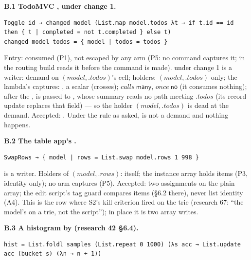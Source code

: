 
\textbf{B.1 TodoMVC , under change 1.}

\begin{Verbatim}
Toggle id → changed model (List.map model.todos λt → if t.id == id then { t | completed = not t.completed } else t)
changed model todos = { model | todos = todos }
\end{Verbatim}

Entry:  consumed (P1),  not escaped by any arm (P5: no command captures it;  in the routing build reads it before the command is made).  under change 1 is a writer: demand on $(\mathit{model},\allowbreak{}.\mathit{todos})$'s cell; holders: $(\mathit{model},\allowbreak{}.\mathit{todos})$ only; the lambda's captures: , a scalar (crosses); $\mathit{calls}\ \mathsf{many}$, $\mathit{once}\ \mathsf{no}$ (it consumes nothing); after the ,  is passed to , whose summary reads no path meeting $.\mathit{todos}$ (its record update replaces that field) — so the holder $(\mathit{model},\allowbreak{}.\mathit{todos})$ is dead at the demand. Accepted: . Under the rule as asked,  is not a demand and nothing happens.

\textbf{B.2 The table app's .}

\begin{Verbatim}
SwapRows → { model | rows = List.swap model.rows 1 998 }
\end{Verbatim}

 is a writer. Holders of $(\mathit{model},\allowbreak{}.\mathit{rows})$: itself; the instance array holds items (P3, identity only); no arm captures  (P5). Accepted: two assignments on the plain array; the edit script's tag guard compares items (§6.2 there), never list identity (A4). This is the row where S2's kill criterion fired on the trie (research 67: “the model's  on a trie, not the script”); in place it is two array writes.

\textbf{B.3 A histogram by  (research 42 §6.4).}

\begin{Verbatim}
hist = List.foldl samples (List.repeat 0 1000) (λs acc → List.update acc (bucket s) (λn → n + 1))
\end{Verbatim}

